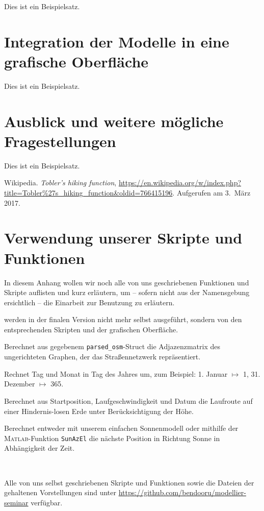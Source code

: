 \documentclass[
    paper=a4,
    DIV14,
    fontsize=12pt,
    pagesize=pdftex,
    toc=bibliographynumbered
]{scrartcl}
\numberwithin{figure}{section}
\numberwithin{equation}{section}
\numberwithin{table}{section}
\begin{document}
Dies ist ein Beispielsatz.

\section{Integration der Modelle in eine grafische Oberfläche}

Dies ist ein Beispielsatz.

\section{Ausblick und weitere mögliche Fragestellungen}

Dies ist ein Beispielsatz.

\begin{thebibliography}{3}
        Wikipedia.
        \emph{Tobler's hiking function},
        \url{https://en.wikipedia.org/w/index.php?title=Tobler%27s_hiking_function&oldid=766415196}.
        Aufgerufen am 3.\ März 2017.
\end{thebibliography}

\appendix
\section{Verwendung unserer Skripte und Funktionen}
In diesem Anhang wollen wir noch alle von uns geschriebenen Funktionen und Skripte
auflisten und kurz erläutern, um -- sofern nicht aus der Namensgebung ersichtlich -- die
Einarbeit zur Benutzung zu erläutern.

\begin{description}[leftmargin=1em]
\item[Funktionen] werden in der finalen Version nicht mehr selbst ausgeführt, sondern von
    den entsprechenden Skripten und der grafischen Oberfläche.
    \begin{description}[format=\texttt,leftmargin=0em]
    \item[adjacencyMatrix.m] Berechnet aus gegebenem \verb|parsed_osm|-Struct die
        Adjazenzmatrix des ungerichteten Graphen, der das Straßennetzwerk repräsentiert.
    \item[day.m] Rechnet Tag und Monat in Tag des Jahres um, zum Beispiel: 1. Januar
        $\mapsto$ 1, 31. Dezember $\mapsto$ 365.
    \item[earth\_follow\_elev.m] Berechnet aus Startposition, Laufgeschwindigkeit und Datum
        die Laufroute auf einer Hindernis-losen Erde unter Berücksichtigung der Höhe.
    \item[earth\_path.m] Berechnet entweder mit unserem einfachen Sonnenmodell oder mithilfe
        der \textsc{Matlab}-Funktion \verb|SunAzEl| die nächste Position in Richtung
        Sonne in Abhängigkeit der Zeit.
    \end{description}
\item[Skripte] $ $
    \begin{description}[format=\texttt]
    \item[test]
    \end{description}
\end{description}

Alle von uns selbst geschriebenen Skripte und Funktionen sowie die Dateien der gehaltenen
Vorstellungen sind unter \url{https://github.com/bendooru/modellier-seminar} verfügbar.
\end{document}
